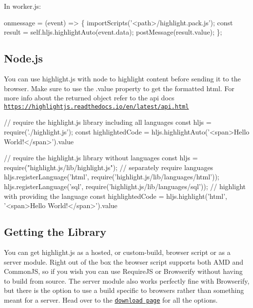In worker.\+js\+:


\begin{DoxyCode}
onmessage = (event) => \{
  importScripts('<path>/highlight.pack.js');
  const result = self.hljs.highlightAuto(event.data);
  postMessage(result.value);
\};
\end{DoxyCode}


\subsection*{Node.\+js}

You can use highlight.\+js with node to highlight content before sending it to the browser. Make sure to use the {\ttfamily .value} property to get the formatted html. For more info about the returned object refer to the api docs \href{https://highlightjs.readthedocs.io/en/latest/api.html}{\tt https\+://highlightjs.\+readthedocs.\+io/en/latest/api.\+html}


\begin{DoxyCode}
// require the highlight.js library including all languages
const hljs = require('./highlight.js');
const highlightedCode = hljs.highlightAuto('<span>Hello World!</span>').value
\end{DoxyCode}



\begin{DoxyCode}
// require the highlight.js library without languages
const hljs = require("highlight.js/lib/highlight.js");
// separately require languages
hljs.registerLanguage('html', require('highlight.js/lib/languages/html'));
hljs.registerLanguage('sql', require('highlight.js/lib/languages/sql'));
// highlight with providing the language
const highlightedCode = hljs.highlight('html', '<span>Hello World!</span>').value
\end{DoxyCode}


\subsection*{Getting the Library}

You can get highlight.\+js as a hosted, or custom-\/build, browser script or as a server module. Right out of the box the browser script supports both A\+MD and Common\+JS, so if you wish you can use Require\+JS or Browserify without having to build from source. The server module also works perfectly fine with Browserify, but there is the option to use a build specific to browsers rather than something meant for a server. Head over to the \href{https://highlightjs.org/download/}{\tt download page} for all the options.

